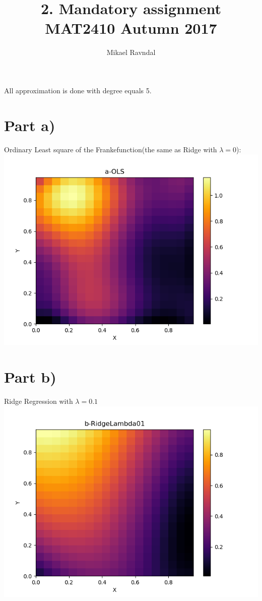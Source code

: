 \documentclass[a4paper,norsk]{article}
\title {2. Mandatory assignment MAT2410 Autumn 2017}
\author {Mikael Ravndal}
\begin{document}
\maketitle
All approximation is done with degree equals 5.
\section*{Part a)}
Ordinary Least square of the Frankefunction(the same as Ridge with $\lambda=0$):
\\ \includegraphics[scale=.7]{a-OLS}
\clearpage
\section*{Part b)}
Ridge Regression with $\lambda = 0.1$
\\ \includegraphics[scale=.7]{b-RidgeLambda01}
\clearpage
\end{document}
